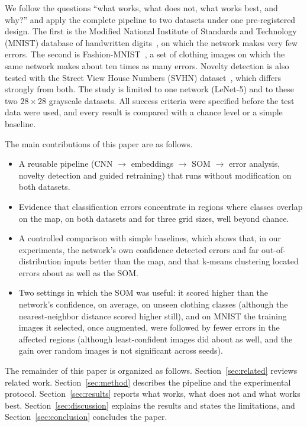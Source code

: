 \documentclass[preprint,review,12pt]{elsarticle}
\begin{document}
We follow the questions ``what works, what does not, what works best, and why?'' and apply the complete pipeline to two datasets under one pre-registered design. The first is the Modified National Institute of Standards and Technology (MNIST) database of handwritten digits~\cite{lecun1998gradient}, on which the network makes very few errors. The second is Fashion-MNIST~\cite{xiao2017fashion}, a set of clothing images on which the same network makes about ten times as many errors. Novelty detection is also tested with the Street View House Numbers (SVHN) dataset~\cite{netzer2011reading}, which differs strongly from both. The study is limited to one network (LeNet-5) and to these two $28\times28$ grayscale datasets. All success criteria were specified before the test data were used, and every result is compared with a chance level or a simple baseline.

The main contributions of this paper are as follows.
\begin{itemize}
  \item A reusable pipeline (CNN $\rightarrow$ embeddings $\rightarrow$ SOM $\rightarrow$ error analysis, novelty detection and guided retraining) that runs without modification on both datasets.
  \item Evidence that classification errors concentrate in regions where classes overlap on the map, on both datasets and for three grid sizes, well beyond chance.
  \item A controlled comparison with simple baselines, which shows that, in our experiments, the network's own confidence detected errors and far out-of-distribution inputs better than the map, and that k-means clustering located errors about as well as the SOM.
  \item Two settings in which the SOM was useful: it scored higher than the network's confidence, on average, on unseen clothing classes (although the nearest-neighbor distance scored higher still), and on MNIST the training images it selected, once augmented, were followed by fewer errors in the affected regions (although least-confident images did about as well, and the gain over random images is not significant across seeds).
\end{itemize}

The remainder of this paper is organized as follows. Section~\ref{sec:related} reviews related work. Section~\ref{sec:method} describes the pipeline and the experimental protocol. Section~\ref{sec:results} reports what works, what does not and what works best. Section~\ref{sec:discussion} explains the results and states the limitations, and Section~\ref{sec:conclusion} concludes the paper.
\end{document}
